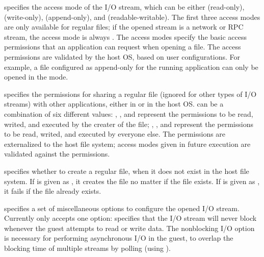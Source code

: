 \begin{compactitem}

\item
{} specifies the access mode of the I/O stream, which can be either  (read-only),  (write-only),  (append-only), and  (readable-writable).
The first three access modes are only available
for regular files; if the opened stream is a network or RPC stream, the access mode is always .
The access modes specify the basic access permissions that an application can request when opening a file.
The access permissions are validated by the host OS, based on user configurations.
For example, a file configured as append-only for the running application can only be opened in the  mode.

\item
{} specifies the permissions for sharing a regular file (ignored for other types of  I/O streams)
with other applications, either in \graphene{} or in the host OS.
 can be a combination of six different values:
, , and 
represent the permissions to be read, writed, and executed by the creater of the file;
, , and 
represent the permissions to be read, writed, and executed by everyone else.
The permissions are externalized to the host file system; access modes given in future execution are validated against the permissions.

\item
{} specifies whether to create a regular file,
when it does not exist in the host file system.
If  is given as ,
it creates the file no matter if the file exists.
If  is given as ,
it fails if the file already exists.

\item
{} specifies a set of miscellaneous options to configure the opened I/O stream.
Currently  only accepts one option:  specifies that the I/O stream will never block whenever the guest attempts to read or write data.
The nonblocking I/O option is necessary for performing asynchronous I/O in the guest, to overlap the blocking time of multiple streams by polling (using ).

\end{compactitem}


